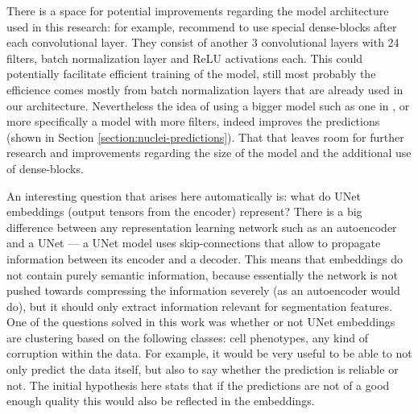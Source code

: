 There is a space for potential improvements regarding the model architecture used in this research: for example, \cite{Cheng_2021} recommend to use special dense-blocks after each convolutional layer. They consist of another 3 convolutional layers with 24 filters, batch normalization layer and ReLU activations each. This could potentially facilitate efficient training of the model, still most probably the efficience comes mostly from batch normalization layers that are already used in our architecture. Nevertheless the idea of using a bigger model such as one in \cite{Cheng_2021}, or more specifically a model with more filters, indeed improves the predictions (shown in Section \ref{section:nuclei-predictions}). That that leaves room for further research and improvements regarding the size of the model and the additional use of dense-blocks.

An interesting question that arises here automatically is: what do UNet embeddings (output tensors from the encoder) represent? There is a big difference between any representation learning network such as an autoencoder and a UNet --- a UNet model uses skip-connections that allow to propagate information between its encoder and a decoder. This means that embeddings do not contain purely semantic information, because essentially the network is not pushed towards compressing the information severely (as an autoencoder would do), but it should only extract information relevant for segmentation features. One of the questions solved in this work was whether or not UNet embeddings are clustering based on the following classes: cell phenotypes, any kind of corruption within the data. For example, it would be very useful to be able to not only predict the data itself, but also to say whether the prediction is reliable or not. The initial hypothesis here stats that if the predictions are not of a good enough quality this would also be reflected in the embeddings.